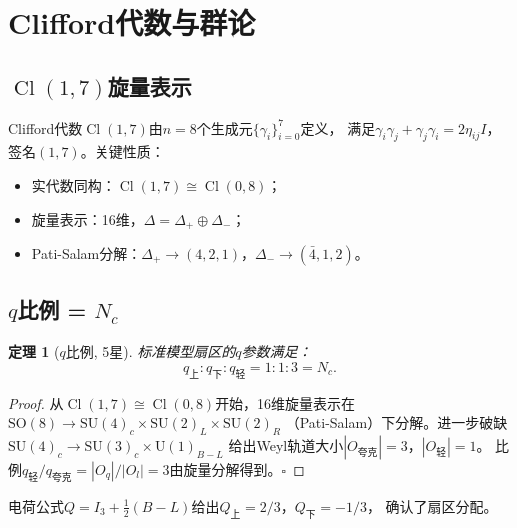 \documentclass[12pt,a4paper]{ctexart}
\newtheorem{theorem}{定理}[section]
\newcommand{\Cl}{\operatorname{Cl}}
\begin{document}
\section{Clifford代数与群论}
\label{sec:clifford}

\subsection{$\Cl(1,7)$旋量表示}

Clifford代数$\Cl(1,7)$由$n = 8$个生成元$\{\gamma_i\}_{i=0}^7$定义，
满足$\gamma_i \gamma_j + \gamma_j \gamma_i = 2\eta_{ij}I$，签名$(1,7)$。关键性质：
\begin{itemize}
  \item 实代数同构：$\Cl(1,7) \cong \Cl(0,8)$；
  \item 旋量表示：16维，$\Delta = \Delta_+ \oplus \Delta_-$；
  \item Pati-Salam分解：$\Delta_+ \to (4,2,1)$，$\Delta_- \to (\bar{4},1,2)$。
\end{itemize}

\subsection{$q$比例 = $N_c$}

\begin{theorem}[$q$比例, 5星]
\label{thm:qratio}
标准模型扇区的$q$参数满足：
\begin{equation}
q_{\text{上}} : q_{\text{下}} : q_{\text{轻}} = 1 : 1 : 3 = N_c.
\end{equation}
\end{theorem}

\begin{proof}
从$\Cl(1,7) \cong \Cl(0,8)$开始，16维旋量表示在
$\text{SO}(8) \to \text{SU}(4)_c \times \text{SU}(2)_L \times \text{SU}(2)_R$
（Pati-Salam）下分解。进一步破缺$\text{SU}(4)_c \to \text{SU}(3)_c \times \text{U}(1)_{B-L}$
给出Weyl轨道大小$|O_{\text{夸克}}| = 3$，$|O_{\text{轻}}| = 1$。
比例$q_{\text{轻}}/q_{\text{夸克}} = |O_q|/|O_l| = 3$由旋量分解得到。$\square$
\end{proof}

电荷公式$Q = I_3 + \frac12(B-L)$给出$Q_{\text{上}} = 2/3$，$Q_{\text{下}} = -1/3$，
确认了扇区分配。

\end{document}
